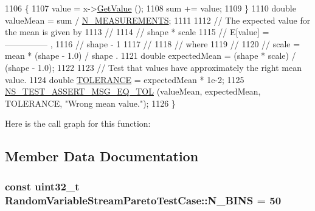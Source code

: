 \begin{DoxyCode}
1106     \{
1107       value = x->\hyperlink{classns3_1_1ParetoRandomVariable_a382e896b56412a86d009c4ec6140c2c5}{GetValue} ();
1108       sum += value;
1109     \}
1110   \textcolor{keywordtype}{double} valueMean = sum / \hyperlink{classRandomVariableStreamParetoTestCase_af8ae7065d2066c50308876e7566636fd}{N\_MEASUREMENTS};
1111 
1112   \textcolor{comment}{// The expected value for the mean is given by}
1113   \textcolor{comment}{//}
1114   \textcolor{comment}{//                   shape * scale}
1115   \textcolor{comment}{//     E[value]  =  ---------------  ,}
1116   \textcolor{comment}{//                     shape - 1}
1117   \textcolor{comment}{// }
1118   \textcolor{comment}{// where}
1119   \textcolor{comment}{// }
1120   \textcolor{comment}{//     scale  =  mean * (shape - 1.0) / shape .}
1121   \textcolor{keywordtype}{double} expectedMean = (shape * scale) / (shape - 1.0);
1122 
1123   \textcolor{comment}{// Test that values have approximately the right mean value.}
1124   \textcolor{keywordtype}{double} \hyperlink{spectrum-value-test_8cc_a30c17564229ec2e37dfea9c6c9ad643e}{TOLERANCE} = expectedMean * 1e-2;
1125   \hyperlink{group__testing_ga9e7861b56b4e70db3b56044cb7a28e41}{NS\_TEST\_ASSERT\_MSG\_EQ\_TOL} (valueMean, expectedMean, TOLERANCE, \textcolor{stringliteral}{"Wrong mean
       value."}); 
1126 \}
\end{DoxyCode}


Here is the call graph for this function\+:




\subsection{Member Data Documentation}
\subsubsection[{\texorpdfstring{N\+\_\+\+B\+I\+NS}{N_BINS}}]{\setlength{\rightskip}{0pt plus 5cm}const uint32\+\_\+t Random\+Variable\+Stream\+Pareto\+Test\+Case\+::\+N\+\_\+\+B\+I\+NS = 50\hspace{0.3cm}{\ttfamily [static]}}\hypertarget{classRandomVariableStreamParetoTestCase_a12b68170c60cd4da893e455d79334d08}{}\label{classRandomVariableStreamParetoTestCase_a12b68170c60cd4da893e455d79334d08}
